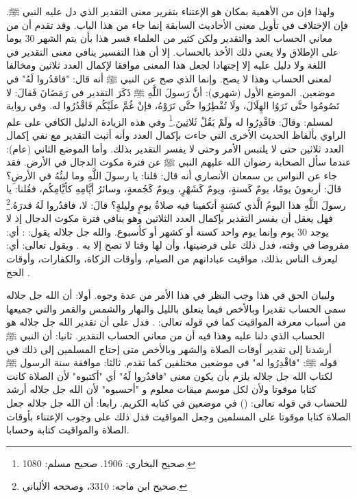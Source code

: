 ولهذا فإن من الأهمية بمكان هو الإعتناء بتقرير معنى التقدير الذي دل عليه النبي ﷺ. فإن الإختلاف في تأويل معنى الأحاديث السابقة إنما جاء من هذا الباب. وقد تقدم أن من معاني الحساب العد والتقدير ولكن كثير من العلماء فسر هذا بأن يتم الشهر 30 يوما على الإطلاق ولا يعني ذلك الأخذ بالحساب. إلا أن هذا التفسير ينافي معنى التقدير في اللغة ولا دليل عليه إلا إجتهادا لجعل هذا المعنى موافقا لإكمال العدد ثلاثين ومخالفا لمعنى الحساب وهذا لا يصح. وإنما الذي صح عن النبي ﷺ أنه قال: "فاقدُروا لَهُ" في موضعين. الموضع الأول (شهري): أنَّ رَسولَ اللَّهِ ﷺ ذَكَرَ التقدير في رَمَضَانَ فَقالَ: لا تَصُومُوا حتَّى تَرَوُا الهِلَالَ، ولَا تُفْطِرُوا حتَّى تَرَوْهُ، فإنْ غُمَّ علَيْكُم فَاقْدُرُوا له. وفي رواية لمسلم: وقالَ: فاقْدِرُوا له ولَمْ يَقُلْ ثَلاثِينَ.\footnote{صحيح البخاري: 1906. صحيح مسلم: 1080.} وفي هذه الزيادة الدليل الكافي على علم الراوي بألفاظ الحديث الأخرى التي جاءت بإكمال العدد وأنه أثبت التقدير مع نفي إكمال العدد ثلاثين حتى لا يلتبس الأمر وحتى لا يفسر التقدير بذلك. وأما الموضع الثاني (عام): عندما سأل الصحابة رضوان الله عليهم النبي ﷺ عن فترة مكوث الدجال في الأرض. فقد جاء عن النواس بن سمعان الأنصاري أنه قال: قلنا: يا رسولَ اللَّهِ وما لبثُهُ في الأرضِ؟ قالَ: أربعونَ يومًا، يومٌ كَسنةٍ، ويومٌ كَشَهْرٍ، ويومٌ كَجُمعةٍ، وسائرُ أيَّامِهِ كأيَّامِكُم، فقُلنا: يا رسولَ اللَّهِ هذا اليومُ الَّذي كسَنةٍ أتكفينا فيه صلاةُ يومٍ وليلةٍ؟ قالَ: لا، فاقدُروا لَهُ قدرَهُ.\footnote{صحيح ابن ماجه: 3310، وصححه الألباني.} فهل يعقل أن يفسر التقدير بإكمال العدد الثلاثين وهو ينافي فترة مكوث الدجال إذ لا يوجد 30 يوم وإنما يوم واحد كسنة أو كشهر أو كأسبوع. والله جل جلاله يقول: \quranayah*[4][103][14] {\footnotesize (\surahname*[4])}:  أي: مفروضا في وقته، فدل ذلك على فرضيتها، وأن لها وقتا لا تصح إلا به \cite{tafsir_Saadi}. ويقول تعالى: \quranayah*[2][189][1-8] {\footnotesize (\surahname*[2])} أي: ليعرف الناس بذلك، مواقيت عباداتهم من الصيام، وأوقات الزكاة، والكفارات، وأوقات الحج \cite{tafsir_Saadi}.

ولبيان الحق في هذا وجب النظر في هذا الأمر من عدة وجوه. أولا: أن الله جل جلاله سمى الحساب تقديرا وبالأخص فيما يتعلق بالليل والنهار والشمس والقمر والتي جميعها من أسباب معرفة المواقيت كما في قوله تعالى: \quranayah*[6][96] {\footnotesize (\surahname*[6])}. فدل على أن تقدير الله جل جلاله هو الحساب الذي دلنا عليه وهذا فيه أن من معاني الحساب التقدير. ثانيا: أن النبي ﷺ أرشدنا إلى تقدير أوقات الصلاة والشهر وبالأخص متى إحتاج المسلمين إلى ذلك في قوله ﷺ: "فاقْدِرُوا له" في موضعين مختلفين كما تقدم. ثالثا: موافقة سنة الرسول ﷺ لكتاب الله جل جلاله يلزم بأن يكون معنى "فاقدُروا لَهُ" أي "أكتبوه" لأن الصلاة كانت كتابا موقوتا ولأن لكل موسم ميقات معلوم و "أحسبوه" لأن الله جل جلاله أرشد للحساب في قوله تعالى: (\quranayah*[10][5][10-13]) في موضعين في كتابه الكريم. رابعا: أن الله جل جلاله جعل الصلاة كتابا موقوتا على المسلمين وجعل المواقيت فدل ذلك على وجوب الإعتناء بأوقات الصلاة والمواقيت كتابة وحسابا.

